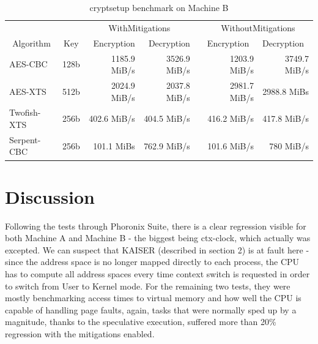 \documentclass{csfourzero}
\begin{document}
\begin{table}[h]
\centering
\begin{tabular}{@{}lcrrrrr@{}}
\multicolumn{1}{c}{}          & \multicolumn{1}{l}{} & \multicolumn{2}{c}{WithMitigations}           & \multicolumn{1}{l}{} & \multicolumn{2}{c}{WithoutMitigations}                          \\ \cmidrule(r){1-4} \cmidrule(l){6-7} 
\multicolumn{1}{c}{Algorithm} & Key                  & Encryption   & \multicolumn{1}{r}{Decryption} & \multicolumn{1}{r}{} & \multicolumn{1}{l}{Encryption} & \multicolumn{1}{l}{Decryption} \\ \cmidrule(r){1-4} \cmidrule(l){6-7} 
AES-CBC                       & 128b                 & 1185.9 MiB/s & 3526.9 MiB/s                   &                      & 1203.9 MiB/s                   & 3749.7 MiB/s                   \\
AES-XTS                       & 512b                 & 2024.9 MiB/s & 2037.8 MiB/s                   &                      & 2981.7 MiB/s                   & 2988.8 MiBs                    \\
Twofish-XTS                   & 256b                 & 402.6 MiB/s  & 404.5 MiB/s                    &                      & 416.2 MiB/s                    & 417.8 MiB/s                    \\
Serpent-CBC                   & 256b                 & 101.1 MiBs   & 762.9 MiB/s                    &                      & 101.6 MiB/s                    & 780 MiB/s                      \\ \cmidrule(r){1-4} \cmidrule(l){6-7} 
\end{tabular}
\caption{cryptsetup benchmark on Machine B}
\label{tab:cryptoB}
\end{table}


\section{Discussion}
\label{sec:discuss}

Following the tests through Phoronix Suite, there is a clear regression visible for both Machine A and Machine B - the biggest being ctx-clock, which actually was excepted. We can suspect that KAISER (described in section 2) is at fault here - since the address space is no longer mapped directly to each process, the CPU has to compute all address spaces every time context switch is requested in order to switch from User to Kernel mode. For the remaining two tests, they were mostly benchmarking access times to virtual memory and how well the CPU is capable of handling page faults, again, tasks that were normally sped up by a magnitude, thanks to the speculative execution, suffered more than 20\% regression with the mitigations enabled.
\end{document}
